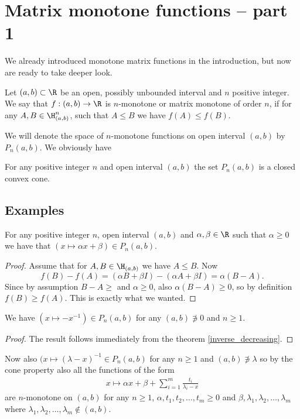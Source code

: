 \chapter{Matrix monotone functions -- part 1}

We already introduced monotone matrix functions in the introduction, but now are ready to take deeper look. 

\begin{maar}
	Let $(a,b) \subset \R$ be an open, possibly unbounded interval and $n$ positive integer. We say that $f : (a, b) \to \R$ is $n$-monotone or matrix monotone of order $n$, if for any $A, B \in \H^{n}_{(a, b)}$, such that $A \leq B$ we have $f(A) \leq f(B)$.
\end{maar}

We will denote the space of $n$-monotone functions on open interval $(a, b)$ by $P_{n}(a, b)$. We obviously have

\begin{prop}
	For any positive integer $n$ and open interval $(a, b)$ the set $P_{n}(a, b)$ is a closed convex cone.
\end{prop}

\section{Examples}

\begin{esim}
	For any positive integer $n$, open interval $(a, b)$ and $\alpha, \beta \in \R$ such that $\alpha \geq 0$ we have that $(x \mapsto \alpha x + \beta) \in P_{n}(a, b)$.
\end{esim}
\begin{proof}
	Assume that for $A, B \in \H_{(a, b)}$ we have $A \leq B$. Now
	\[
		f(B) - f(A) = (\alpha B + \beta I) - (\alpha A + \beta I) = \alpha (B - A).
	\]
	Since by assumption $B - A \geq $ and $\alpha \geq 0$, also $\alpha (B - A) \geq 0$, so by definition $f(B) \geq f(A)$. This is exactly what we wanted.
\end{proof}

\begin{prop}
	We have $(x \mapsto -x^{-1}) \in P_{n}(a, b)$ for any $(a, b) \not\ni 0$ and $n \geq 1$.
\end{prop}
\begin{proof}
	The result follows immediately from the theorem \ref{inverse_decreasing}.
\end{proof}

Now also $(x \mapsto (\lambda - x)^{-1} \in P_{n}(a, b)$ for any $n \geq 1$ and $(a, b) \not\ni \lambda$ so by the cone property also all the functions of the form
\begin{align}\label{finite_pick}
	x \mapsto \alpha x + \beta + \sum_{i = 1}^{m} \frac{t_{i}}{\lambda_{i} - x}
\end{align}
are $n$-monotone on $(a, b)$ for any $n \geq 1$, $\alpha, t_{1}, t_{2}, \ldots, t_{m} \geq 0$ and $\beta, \lambda_{1}, \lambda_{2}, \ldots, \lambda_{m}$ where $\lambda_{1}, \lambda_{2}, \ldots, \lambda_{m} \not\in (a, b)$.

